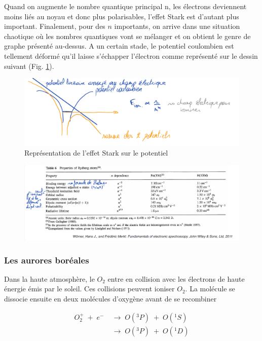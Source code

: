 Quand on augmente le nombre quantique principal n, les électrons deviennent moins liés au noyau et donc plus polarisables, l'effet Stark est d'autant plus important. Finalement, pour des $n$ importants, on arrive dans une situation chaotique où les nombres quantiques vont se mélanger et on obtient le genre de graphe présenté au-dessus. A un certain stade, le potentiel coulombien est tellement déformé qu'il laisse s'échapper l'électron comme représenté sur le dessin suivant (Fig. \ref{fig:fig_stark}).\\

\begin{figure}[H]
    \centering
    \includegraphics[width=\textwidth]{Images2/DessinStark.PNG}
    \caption{Représentation de l'effet Stark sur le potentiel}
    \label{fig:fig_stark}
\end{figure}
\begin{figure}[H]
    \centering
    \includegraphics[width=\textwidth]{Images2/TableauStark.PNG}
\end{figure}




\subsubsection{Les aurores boréales}

Dans la haute atmosphère, le $O_2$ entre en collision avec les électrons de haute énergie émis par le soleil. Ces collisions peuvent ioniser $O_2$. La molécule se dissocie ensuite en deux molécules d'oxygène avant de se recombiner

\begin{align*}
    O_2^+ \; + \; e^- \; &\longrightarrow \;O(^3P)\; +\; O(^1S)  \\
    &\longrightarrow\; O(^3P)\; +\; O(^1D)
\end{align*}

